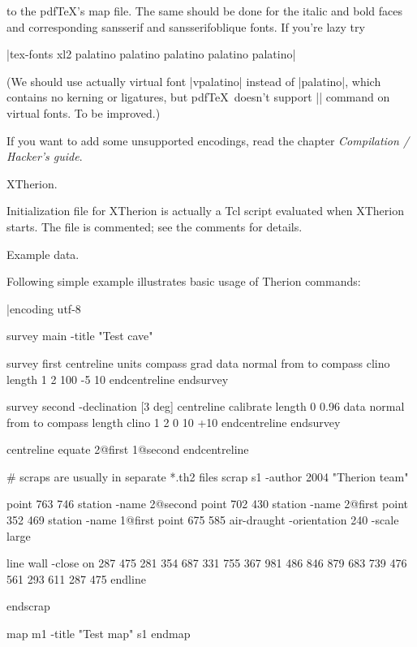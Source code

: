   to the pdf\TeX's map file. The same should be done for the italic and bold
  faces and corresponding sansserif and sansserifoblique fonts. If you're lazy
  try 
  
  |tex-fonts xl2 palatino palatino palatino palatino palatino|
  
  (We should use actually virtual font |vpalatino| instead of |palatino|,
  which contains no kerning or ligatures, but
  pdf\TeX\ doesn't support |\pdfincludechars| command on virtual fonts.
  To be improved.)
    
  If you want to add some unsupported encodings, 
  read the chapter {\it Compilation / Hacker's guide}. 
\endlist


\subsubchapter XTherion.

Initialization file for XTherion is actually a Tcl script evaluated when 
XTherion starts. The file is commented; see the comments for details.


%

\subchapter Example data.

Following simple example illustrates basic usage of Therion commands:

|encoding  utf-8

survey main -title "Test cave"
  
  survey first
    centreline
      units compass grad
      data normal from to compass clino length
                  1    2  100     -5    10
    endcentreline
  endsurvey

  survey second -declination [3 deg]
    centreline
      calibrate length 0 0.96
      data normal from to compass length clino
                  1    2  0       10     +10
    endcentreline
  endsurvey
 
  centreline
    equate 2@first 1@second
  endcentreline
 
  # scraps are usually in separate *.th2 files
  scrap s1 -author 2004 "Therion team"

    point 763 746 station -name 2@second
    point 702 430 station -name 2@first
    point 352 469 station -name 1@first
    point 675 585 air-draught -orientation 240 -scale large

    line wall -close on
      287 475
      281 354 687 331 755 367
      981 486 846 879 683 739
      476 561 293 611 287 475
    endline

  endscrap

  map m1 -title "Test map"
    s1
  endmap
 
